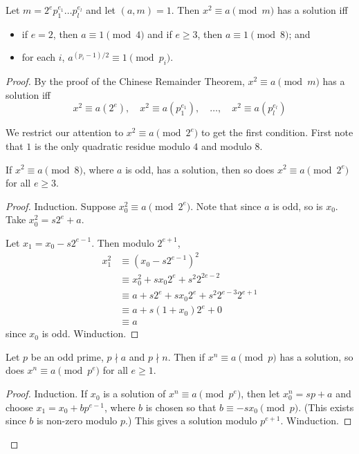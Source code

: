 \begin{proposition} \label{thm:quad_res:condition}
    Let $m = 2^e p_1^{e_1} \dots p_l^{e_l}$ and let $(a, m) = 1$.
    Then $x^2 \equiv a \pmod{m}$ has a solution iff
    \begin{itemize}
        \item if $e = 2$, then $a \equiv 1 \pmod 4$ and if $e \ge 3$, then
        $a \equiv 1 \pmod 8$; and
        \item for each $i$, $a^{(p_i - 1)/2} \equiv 1 \pmod{p_i}$.
    \end{itemize}
\end{proposition}
\begin{proof}
    By the proof of the Chinese Remainder Theorem, $x^2 \equiv a \pmod m$
    has a solution iff \[
        x^2 \equiv a (2^e), \quad x^2 \equiv a (p_1^{e_1}),
            \quad \dots, \quad x^2 \equiv a (p_l^{e_l}) %
    \]

    We restrict our attention to $x^2 \equiv a \pmod{2^e}$ to get the first
    condition.
    First note that $1$ is the only quadratic residue modulo $4$ and
    modulo $8$.

    \begin{lemma}
        If $x^2 \equiv a \pmod 8$, where $a$ is odd, has a solution, then
        so does $x^2 \equiv a \pmod{2^e}$ for all $e \ge 3$.
    \end{lemma}
    \begin{proof}
        Induction.
        Suppose $x_0^2 \equiv a \pmod{2^e}$.
        Note that since $a$ is odd, so is $x_0$.
        Take $x_0^2 = s 2^e + a$.

        Let $x_1 = x_0 - s2^{e-1}$.
        Then modulo $2^{e+1}$, \begin{align*}
            x_1^2 &\equiv (x_0 - s2^{e-1})^2 \\
                &\equiv x_0^2 + sx_0 2^e + s^2 2^{2e-2} \\
                &\equiv a + s2^e + sx_0 2^e + s^2 2^{e-3} 2^{e+1} \\
                &\equiv a + s(1 + x_0) 2^e + 0 \\
                &\equiv a
        \end{align*} since $x_0$ is odd.
        Winduction.
    \end{proof}

    \begin{lemma}
        Let $p$ be an odd prime, $p \nmid a$ and $p \nmid n$.
        Then if $x^n \equiv a \pmod p$ has a solution,
        so does $x^n \equiv a \pmod{p^e}$ for all $e \ge 1$.
    \end{lemma}
    \begin{proof}
        Induction.
        If $x_0$ is a solution of $x^n \equiv a \pmod {p^e}$, then
        let $x_0^n = s p + a$ and choose $x_1 = x_0 + b p^{e-1}$, where
        $b$ is chosen so that $b \equiv -sx_0 \pmod p$.
        (This exists since $b$ is non-zero modulo $p$.)
        This gives a solution modulo $p^{e+1}$.
        Winduction.
    \end{proof}


\end{proof}
